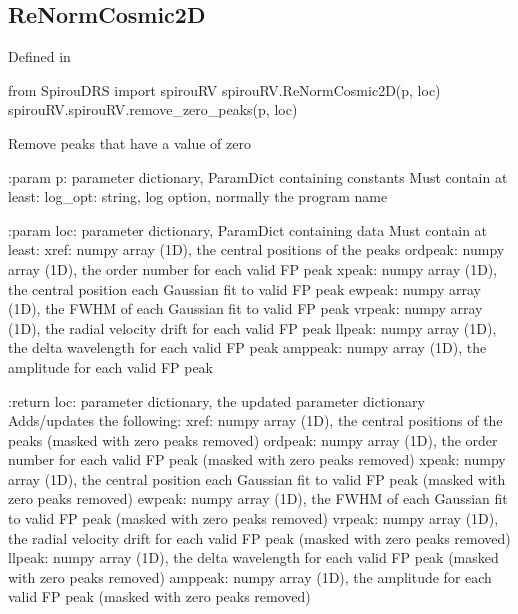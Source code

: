 \noindent\begin{minipage}{\textwidth}
\subsection{ReNormCosmic2D}

Defined in \spirouRV{}

\begin{pythonbox}
from SpirouDRS import spirouRV
spirouRV.ReNormCosmic2D(p, loc)
spirouRV.spirouRV.remove_zero_peaks(p, loc)
\end{pythonbox}

\begin{pythondocstring}
Remove peaks that have a value of zero

:param p: parameter dictionary, ParamDict containing constants
    Must contain at least:
            log_opt: string, log option, normally the program name

:param loc: parameter dictionary, ParamDict containing data
        Must contain at least:
            xref: numpy array (1D), the central positions of the peaks
            ordpeak: numpy array (1D), the order number for each valid FP
                     peak
            xpeak: numpy array (1D), the central position each Gaussian fit
                   to valid FP peak
            ewpeak: numpy array (1D), the FWHM of each Gaussian fit
                    to valid FP peak
            vrpeak: numpy array (1D), the radial velocity drift for each
                    valid FP peak
            llpeak: numpy array (1D), the delta wavelength for each valid
                    FP peak
            amppeak: numpy array (1D), the amplitude for each valid FP peak

:return loc: parameter dictionary, the updated parameter dictionary
        Adds/updates the following:
            xref: numpy array (1D), the central positions of the peaks
                  (masked with zero peaks removed)
            ordpeak: numpy array (1D), the order number for each valid FP
                     peak (masked with zero peaks removed)
            xpeak: numpy array (1D), the central position each Gaussian fit
                   to valid FP peak (masked with zero peaks removed)
            ewpeak: numpy array (1D), the FWHM of each Gaussian fit
                    to valid FP peak (masked with zero peaks removed)
            vrpeak: numpy array (1D), the radial velocity drift for each
                    valid FP peak (masked with zero peaks removed)
            llpeak: numpy array (1D), the delta wavelength for each valid
                    FP peak (masked with zero peaks removed)
            amppeak: numpy array (1D), the amplitude for each valid FP peak
                     (masked with zero peaks removed)
\end{pythondocstring}
\end{minipage}

